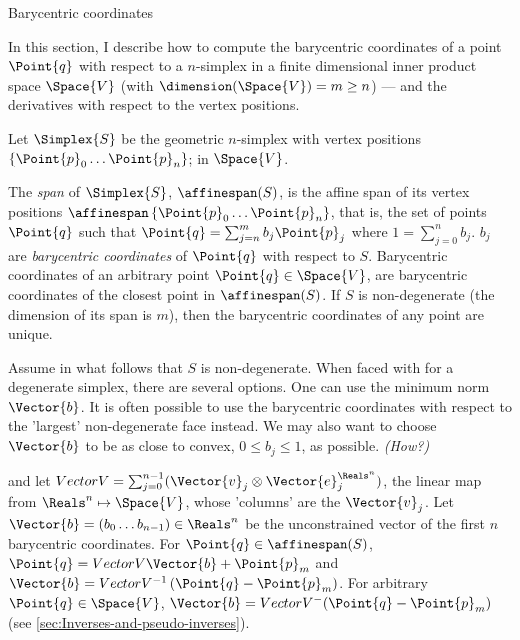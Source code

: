 \begin{plSection}{Barycentric coordinates}
\label{sec:barycentric-coordinates}

In this section, I describe how to compute
the barycentric coordinates of a point $\Point{q}$
with respect to a $n$-simplex in
a finite dimensional inner product space $\Space{V}$
(with $\dimension (\Space{V} ) = m \ge n$) ---
and the derivatives with respect to the vertex positions.

Let $\Simplex{S}$ be the geometric $n$-simplex
with vertex positions $\left\{\Point{p}_0  \ldots  \Point{p}_n\right\}$;
in $\Space{V}$.

The {\it span} of $\Simplex{S}$, $\affinespan ( S )$,
is the affine span of its vertex positions
$\affinespan \left\{\Point{p}_0  \ldots  \Point{p}_n\right\}$,
that is, the set of points $\Point{q}$ such that
$\Point{q} = \sum_{j=n}^{m} b_j \Point{p}_j $ 
where $1 = \sum_{j=0}^{n} b_j $.
$b_j$ are {\it barycentric coordinates} of $\Point{q}$ 
with respect to $S$.
Barycentric coordinates of an arbitrary point 
$\Point{q} \in \Space{V}$,
are barycentric coordinates of the closest point in $\affinespan(S)$.
If $S$ is non-degenerate (the dimension of its span is $m$),
then the barycentric coordinates of any point are unique.

Assume in what follows that $S$ is non-degenerate.
When faced with for a degenerate simplex, there are several options.
One can use the minimum norm $\Vector{b}$.
It is often possible to use the barycentric coordinates
with respect to the 'largest' non-degenerate face instead.
We may also want to choose $\Vector{b}$ to be as close to convex,
$0 \le b_j \le 1$, as possible. {\it (How?)}

and let $Vector{V} =
 \sum_{j=0}^{n-1} ( \Vector{v}_j \otimes \Vector{e}_j^{\Reals^n} )$,
the linear map from $\Reals^n \mapsto \Space{V}$,
whose 'columns' are the $\Vector{v}_j$.
Let $\Vector{b} = \left( b_0 \ldots b_{n-1} \right) \in \Reals^n$
be the unconstrained vector of the first $n$ barycentric coordinates.
For $\Point{q} \in \affinespan ( S )$, 
$\Point{q} = Vector{V} \Vector{b} + \Point{p}_m$
and $\Vector{b} = 
Vector{V}^{-1} \left ( \Point{q} - \Point{p}_m \right)$.
For arbitrary $\Point{q} \in \Space{V}$,
$\Vector{b} = Vector{V}^{-} (\Point{q} - \Point{p}_m)$
(see \cref{sec:Inverses-and-pseudo-inverses}).

\end{plSection}%
